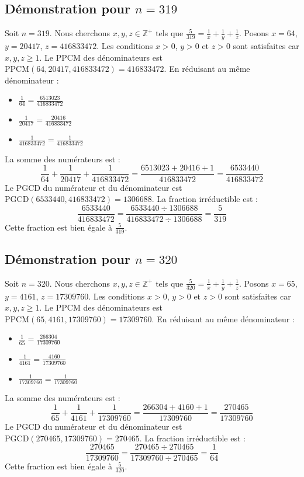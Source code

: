 \documentclass[11pt,a4paper]{article}
\begin{document}
\subsection{Démonstration pour $n = 319$}
Soit $n = 319$. Nous cherchons $x, y, z \in \mathbb{Z}^{+}$ tels que $\frac{5}{319} = \frac{1}{x} + \frac{1}{y} + \frac{1}{z}$.
Posons $x = 64$, $y = 20417$, $z = 416833472$.
Les conditions $x > 0$, $y > 0$ et $z > 0$ sont satisfaites car $x, y, z \geq 1$.
Le PPCM des dénominateurs est $\text{PPCM}(64, 20417, 416833472) = 416833472$.
En réduisant au même dénominateur :
\begin{itemize}
    \item $\frac{1}{64} = \frac{6513023}{416833472}$
    \item $\frac{1}{20417} = \frac{20416}{416833472}$
    \item $\frac{1}{416833472} = \frac{1}{416833472}$
\end{itemize}
La somme des numérateurs est :
$$ \frac{1}{64} + \frac{1}{20417} + \frac{1}{416833472} = \frac{6513023 + 20416 + 1}{416833472} = \frac{6533440}{416833472} $$
Le PGCD du numérateur et du dénominateur est $\text{PGCD}(6533440, 416833472) = 1306688$.
La fraction irréductible est :
$$ \frac{6533440}{416833472} = \frac{6533440 \div 1306688}{416833472 \div 1306688} = \frac{5}{319} $$
Cette fraction est bien égale à $\frac{5}{319}$.

\subsection{Démonstration pour $n = 320$}
Soit $n = 320$. Nous cherchons $x, y, z \in \mathbb{Z}^{+}$ tels que $\frac{5}{320} = \frac{1}{x} + \frac{1}{y} + \frac{1}{z}$.
Posons $x = 65$, $y = 4161$, $z = 17309760$.
Les conditions $x > 0$, $y > 0$ et $z > 0$ sont satisfaites car $x, y, z \geq 1$.
Le PPCM des dénominateurs est $\text{PPCM}(65, 4161, 17309760) = 17309760$.
En réduisant au même dénominateur :
\begin{itemize}
    \item $\frac{1}{65} = \frac{266304}{17309760}$
    \item $\frac{1}{4161} = \frac{4160}{17309760}$
    \item $\frac{1}{17309760} = \frac{1}{17309760}$
\end{itemize}
La somme des numérateurs est :
$$ \frac{1}{65} + \frac{1}{4161} + \frac{1}{17309760} = \frac{266304 + 4160 + 1}{17309760} = \frac{270465}{17309760} $$
Le PGCD du numérateur et du dénominateur est $\text{PGCD}(270465, 17309760) = 270465$.
La fraction irréductible est :
$$ \frac{270465}{17309760} = \frac{270465 \div 270465}{17309760 \div 270465} = \frac{1}{64} $$
Cette fraction est bien égale à $\frac{5}{320}$.
\end{document}
